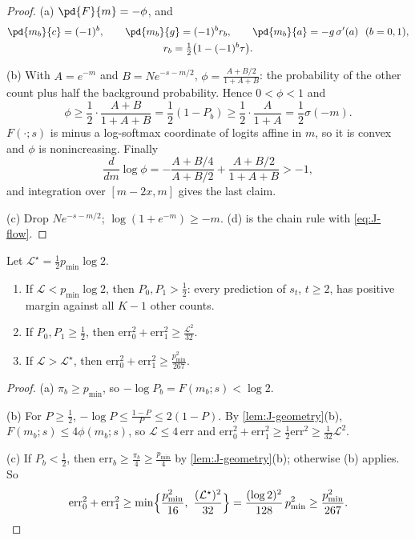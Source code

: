 \begin{proof}
(a) $\pd{F}{m}=-\phi$, and
\begin{gather*}
 \pd{m_b}{c}=(-1)^b,\qquad \pd{m_b}{g}=(-1)^br_b,\qquad \pd{m_b}{a}=-g\,\sigma'(a)\ \ (b=0,1),\\
 r_b=\tfrac{1}{2}\bigl(1-(-1)^b\tau\bigr).
\end{gather*}

(b) With $A=e^{-m}$ and $B=Ne^{-s-m/2}$, $\phi=\frac{A+B/2}{1+A+B}$: the probability of the other count plus half the background
probability. Hence $0<\phi<1$ and
\[
 \phi\ge\frac{1}{2}\cdot\frac{A+B}{1+A+B}=\frac{1}{2}(1-P_b)\ge\frac{1}{2}\cdot\frac{A}{1+A}=\frac{1}{2}\sigma(-m).
\]
$F(\cdot;s)$ is minus a log-softmax coordinate of logits affine in $m$, so it is convex and $\phi$ is nonincreasing. Finally
\[
 \frac{d}{dm}\log\phi=-\frac{A+B/4}{A+B/2}+\frac{A+B/2}{1+A+B}>-1,
\]
and integration over $[m-2x,m]$ gives the last claim.

(c) Drop $Ne^{-s-m/2}$; $\log(1+e^{-m})\ge-m$. (d) is the chain rule with \cref{eq:J-flow}.
\end{proof}

\begin{lemma}
\label{lem:J-levels}
Let $\mathcal L^\star=\frac{1}{2}p_{\min}\log2$.
\begin{enumerate}[label=(\alph*),leftmargin=*,itemsep=2pt,topsep=3pt]
\item If $\mathcal L<p_{\min}\log2$, then $P_0,P_1>\frac{1}{2}$: every prediction of $s_t$, $t\ge2$, has positive margin against all $K-1$ other counts.
\item If $P_0,P_1\ge\frac{1}{2}$, then $\mathrm{err}_0^2+\mathrm{err}_1^2\ge \frac{\mathcal L^2}{32}$.
\item If $\mathcal L>\mathcal L^\star$, then $\mathrm{err}_0^2+\mathrm{err}_1^2\ge \frac{p_{\min}^2}{267}$.
\end{enumerate}
\end{lemma}

\begin{proof}
(a) $\pi_b\ge p_{\min}$, so $-\log P_b=F(m_b;s)<\log2$.

(b) For $P\ge\frac{1}{2}$, $-\log P\le\frac{1-P}{P}\le2(1-P)$. By \cref{lem:J-geometry}(b), $F(m_b;s)\le4\phi(m_b;s)$, so $\mathcal L\le4\,\mathrm{err}$ and
$\mathrm{err}_0^2+\mathrm{err}_1^2\ge\frac{1}{2}\mathrm{err}^2\ge\frac{1}{32}\mathcal L^2$.

(c) If $P_b<\frac{1}{2}$, then $\mathrm{err}_b\ge\frac{\pi_b}{4}\ge\frac{p_{\min}}{4}$ by \cref{lem:J-geometry}(b); otherwise (b) applies. So
\[
 \mathrm{err}_0^2+\mathrm{err}_1^2\ge\min\Bigl\{\frac{p_{\min}^2}{16},\ \frac{(\mathcal L^\star)^2}{32}\Bigr\}=\frac{(\log2)^2}{128}\,p_{\min}^2\ge\frac{p_{\min}^2}{267}.
\qedhere
\]
\end{proof}

